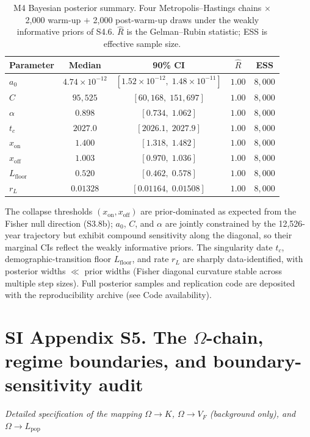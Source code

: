 \documentclass[11pt]{article}
\begin{document}
\begin{table}[H]
\centering
\caption{M4 Bayesian posterior summary.  Four Metropolis--Hastings chains $\times$ 2{,}000 warm-up $+$ 2{,}000 post-warm-up draws under the weakly informative priors of S4.6.  $\hat R$ is the Gelman--Rubin statistic; ESS is effective sample size.}
\label{tab:S4_6_posterior}
\begin{tabular}{lcccc}
\toprule
Parameter & Median & 90\% CI & $\hat R$ & ESS \\
\midrule
$a_0$ & $4.74\times10^{-12}$ & $[1.52\times10^{-12},\;1.48\times10^{-11}]$ & $1.00$ & $8{,}000$ \\
$C$ & $95{,}525$ & $[60{,}168,\;151{,}697]$ & $1.00$ & $8{,}000$ \\
$\alpha$ & $0.898$ & $[0.734,\;1.062]$ & $1.00$ & $8{,}000$ \\
$t_c$ & $2027.0$ & $[2026.1,\;2027.9]$ & $1.00$ & $8{,}000$ \\
$x_{\mathrm{on}}$ & $1.400$ & $[1.318,\;1.482]$ & $1.00$ & $8{,}000$ \\
$x_{\mathrm{off}}$ & $1.003$ & $[0.970,\;1.036]$ & $1.00$ & $8{,}000$ \\
$L_{\mathrm{floor}}$ & $0.520$ & $[0.462,\;0.578]$ & $1.00$ & $8{,}000$ \\
$r_L$ & $0.01328$ & $[0.01164,\;0.01508]$ & $1.00$ & $8{,}000$ \\
\bottomrule
\end{tabular}
\end{table}

\noindent The collapse thresholds $(x_{\mathrm{on}},x_{\mathrm{off}})$ are prior-dominated as expected from the Fisher null direction (S3.8b); $a_0$, $C$, and $\alpha$ are jointly constrained by the 12{,}526-year trajectory but exhibit compound sensitivity along the diagonal, so their marginal CIs reflect the weakly informative priors.  The singularity date $t_c$, demographic-transition floor $L_{\mathrm{floor}}$, and rate $r_L$ are sharply data-identified, with posterior widths $\ll$ prior widths (Fisher diagonal curvature stable across multiple step sizes).  Full posterior samples and replication code are deposited with the reproducibility archive (see Code availability).

\pagebreak

\section*{SI Appendix S5. The $\Omega$-chain, regime boundaries, and boundary-sensitivity audit}\label{sec:s5-omega}
\noindent\textit{Detailed specification of the mapping $\Omega\rightarrow K$, $\Omega\rightarrow V_F$ (background only), and $\Omega\rightarrow L_{\mathrm{pop}}$}\medskip
\end{document}
